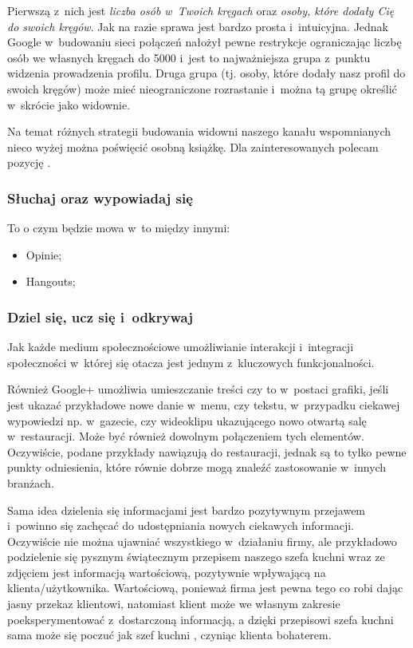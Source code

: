 Pierwszą z~nich jest \emph{liczba osób w~Twoich kręgach} oraz \emph{osoby, które dodały Cię do swoich kręgów}. Jak na razie sprawa jest bardzo prosta i~intuicyjna. Jednak Google w~budowaniu sieci połączeń nałożył pewne restrykcje ograniczając liczbę osób we własnych kręgach do 5000 i~jest to najważniejsza grupa z~punktu widzenia prowadzenia profilu. Druga grupa (tj. osoby, które  dodały nasz profil do swoich kręgów) może mieć nieograniczone rozrastanie i~można tą grupę określić w~skrócie jako widownie. 

Na temat różnych strategii budowania widowni naszego kanału wspomnianych nieco wyżej można poświęcić osobną książkę. Dla zainteresowanych polecam pozycję \parencite{Brogan12}.


\subsubsection{Słuchaj oraz wypowiadaj się}
\lipsum[24]

To o czym będzie mowa w~to między innymi:

\begin{itemize}
\item Opinie;
\item Hangouts;
\end{itemize}

\lipsum[67-70]

\lipsum[100-101]


\subsubsection{Dziel się, ucz się i~odkrywaj}
Jak każde medium społecznościowe umożliwianie interakcji i~integracji społeczności w~której się otacza jest jednym z~kluczowych funkcjonalności. 

Również Google+ umożliwia umieszczanie treści czy to w~postaci grafiki, jeśli jest ukazać przykładowe nowe danie w~menu, czy tekstu, w~przypadku ciekawej wypowiedzi np. w~gazecie, czy wideoklipu ukazującego nowo otwartą salę w~restauracji. Może być również dowolnym połączeniem tych elementów. Oczywiście, podane przykłady nawiązują do restauracji, jednak są to tylko pewne punkty odniesienia, które równie dobrze mogą znaleźć zastosowanie w~innych branżach.

Sama idea dzielenia się informacjami jest bardzo pozytywnym przejawem i~powinno się zachęcać do udostępniania nowych ciekawych informacji. Oczywiście nie można ujawniać wszystkiego w~działaniu firmy, ale przykładowo podzielenie się pysznym świątecznym przepisem naszego szefa kuchni wraz ze zdjęciem jest informacją wartościową, pozytywnie wpływającą na klienta/użytkownika. Wartościową, ponieważ firma jest pewna tego co robi dając jasny przekaz klientowi, natomiast klient może we własnym zakresie poeksperymentować z~dostarczoną informacją, a dzięki przepisowi szefa kuchni sama może się poczuć jak szef kuchni \parencite[s.101]{Brogan12}, czyniąc klienta bohaterem.

